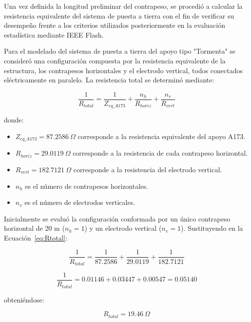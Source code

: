 \documentclass[12pt,letterpaper]{article}
\begin{document}
Una vez definida la longitud preliminar del contrapeso, se procedió a calcular la resistencia equivalente del sistema de puesta a tierra con el fin de verificar su desempeño frente a los criterios utilizados posteriormente en la evaluación estadística mediante IEEE Flash.

Para el modelado del sistema de puesta a tierra del apoyo tipo "Tormenta" se consideró una configuración compuesta por la resistencia equivalente de la estructura, los contrapesos horizontales y el electrodo vertical, todos conectados eléctricamente en paralelo. La resistencia total se determinó mediante:

\begin{equation}
\frac{1}{R_{total}}
=
\frac{1}{Z_{eq\_A173}}
+
\frac{n_h}{R_{horiz}}
+
\frac{n_v}{R_{vert}}
\label{eq:Rtotal}
\end{equation}

donde:

\begin{itemize}
    \item $Z_{eq\_A173}=87.2586\ \Omega$ corresponde a la resistencia equivalente del apoyo A173.
    \item $R_{horiz}=29.0119\ \Omega$ corresponde a la resistencia de cada contrapeso horizontal.
    \item $R_{vert}=182.7121\ \Omega$ corresponde a la resistencia del electrodo vertical.
    \item $n_h$ es el número de contrapesos horizontales.
    \item $n_v$ es el número de electrodos verticales.
\end{itemize}

Inicialmente se evaluó la configuración conformada por un único contrapeso horizontal de 20 m ($n_h=1$) y un electrodo vertical ($n_v=1$). Sustituyendo en la Ecuación~\eqref{eq:Rtotal}:

\begin{equation*}
\frac{1}{R_{total}}
=
\frac{1}{87.2586}
+
\frac{1}{29.0119}
+
\frac{1}{182.7121}
\end{equation*}

\begin{equation*}
\frac{1}{R_{total}}
=
0.01146
+
0.03447
+
0.00547
=
0.05140
\end{equation*}

obteniéndose:

\begin{equation}
R_{total}=19.46\ \Omega
\end{equation}
\end{document}
